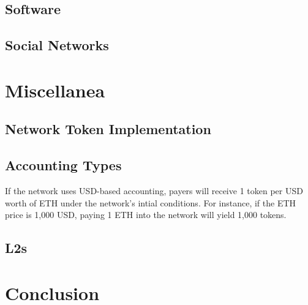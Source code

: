 \documentclass{article}
\begin{document}
\subsection{Software}

\subsection{Social Networks}

\section{Miscellanea}

\subsection{Network Token Implementation}

\subsection{Accounting Types}\label{sec:accounting_types}

If the network uses USD-based accounting, payers will receive 1 token per USD worth of ETH under the network's intial conditions. For instance, if the ETH price is 1,000 USD, paying 1 ETH into the network will yield 1,000 tokens.

\subsection{L2s}

\section{Conclusion}



\end{document}
